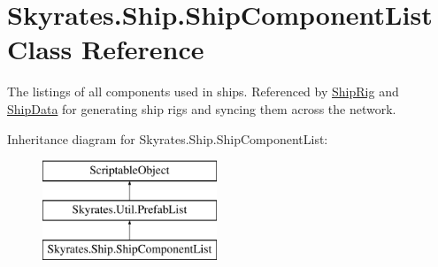 \hypertarget{class_skyrates_1_1_ship_1_1_ship_component_list}{\section{Skyrates.\-Ship.\-Ship\-Component\-List Class Reference}
\label{class_skyrates_1_1_ship_1_1_ship_component_list}
}


The listings of all components used in ships. Referenced by \hyperlink{class_skyrates_1_1_ship_1_1_ship_rig}{Ship\-Rig} and \hyperlink{class_skyrates_1_1_ship_1_1_ship_data}{Ship\-Data} for generating ship rigs and syncing them across the network.  


Inheritance diagram for Skyrates.\-Ship.\-Ship\-Component\-List\-:\begin{figure}[H]
\begin{center}
\leavevmode
\includegraphics[height=3.000000cm]{class_skyrates_1_1_ship_1_1_ship_component_list}
\end{center}
\end{figure}
